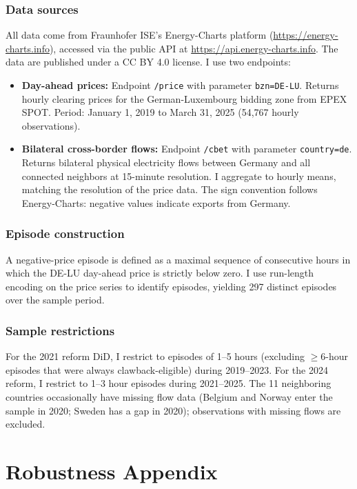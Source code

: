 \documentclass[12pt]{article}
\begin{document}
\subsubsection*{Data sources}
All data come from Fraunhofer ISE's Energy-Charts platform (\url{https://energy-charts.info}), accessed via the public API at \url{https://api.energy-charts.info}. The data are published under a CC BY 4.0 license. I use two endpoints:

\begin{itemize}
\item \textbf{Day-ahead prices:} Endpoint \texttt{/price} with parameter \texttt{bzn=DE-LU}. Returns hourly clearing prices for the German-Luxembourg bidding zone from EPEX SPOT. Period: January 1, 2019 to March 31, 2025 (54,767 hourly observations).
\item \textbf{Bilateral cross-border flows:} Endpoint \texttt{/cbet} with parameter \texttt{country=de}. Returns bilateral physical electricity flows between Germany and all connected neighbors at 15-minute resolution. I aggregate to hourly means, matching the resolution of the price data. The sign convention follows Energy-Charts: negative values indicate exports from Germany.
\end{itemize}

\subsubsection*{Episode construction}
A negative-price episode is defined as a maximal sequence of consecutive hours in which the DE-LU day-ahead price is strictly below zero. I use run-length encoding on the price series to identify episodes, yielding 297 distinct episodes over the sample period.

\subsubsection*{Sample restrictions}
For the 2021 reform DiD, I restrict to episodes of 1--5 hours (excluding $\geq$6-hour episodes that were always clawback-eligible) during 2019--2023. For the 2024 reform, I restrict to 1--3 hour episodes during 2021--2025. The 11 neighboring countries occasionally have missing flow data (Belgium and Norway enter the sample in 2020; Sweden has a gap in 2020); observations with missing flows are excluded.

\section{Robustness Appendix}
\end{document}
